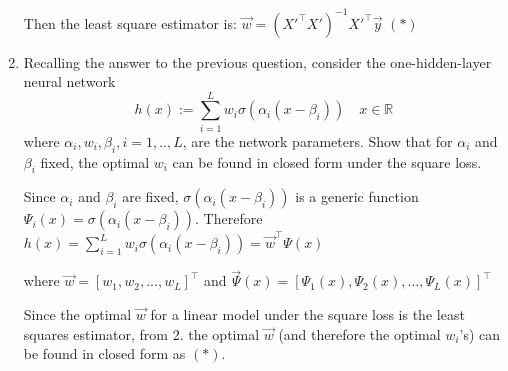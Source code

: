 \documentclass[a4paper,11pt,oneside]{book}
\newcounter{question}[section]
\begin{document}
\begin{enumerate}
\begin{solution}
            Then the least square estimator is:
            $\vec{w} = (X'^{\top}X')^{-1}X'^{\top}\vec{y}$ $(*)$
        \end{solution}
    \item Recalling the answer to the previous question, consider the one-hidden-layer neural network
        $$h(x) := \sum_{i=1}^L w_i\sigma(\alpha_i(x - \beta_i)) \quad x \in \mathbb{R}$$
        where $\alpha_i, w_i, \beta_i, i = 1,..,L$, are the network parameters. Show that for $\alpha_i$ and $\beta_i$ fixed, the optimal $w_i$ can be found in closed form under the square loss.

        \begin{solution}
            Since $\alpha_i$ and $\beta_i$ are fixed, $\sigma(\alpha_i(x-\beta_i))$ is a generic function $\Psi_i(x) = \sigma(\alpha_i(x-\beta_i))$. Therefore $h(x) = \sum_{i=1}^L w_i\sigma(\alpha_i(x-\beta_i)) = \vec{w}^\top\Psi(x)$ 
            
            where $\vec{w} = [w_1, w_2, ..., w_L]^\top$ and $\vec{\Psi}(x)=[\Psi_1(x),\Psi_2(x),...,\Psi_L(x)]^\top$
            
            Since the optimal $\vec{w}$ for a linear model under the square loss is the least squares estimator, from 2. the optimal $\vec{w}$ (and therefore the optimal $w_i$'s) can be found in closed form as $(*)$.
        \end{solution}
\end{enumerate}

\clearpage
\end{document}
